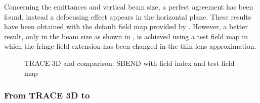 \begin{itemize}
Concerning the emittances and vertical beam size, a perfect agreement has been found, instead a defocusing effect appears in the horizontal plane. These results have been obtained with the default field map provided by \opal. However, a better result, only in the beam size as shown in , is achieved using a test field map in which the fringe field extension has been changed in the thin lens approximation.

\begin{figure}[htbp]
\begin{center}
    \hspace{1.8cm}
    \caption{TRACE 3D and \opal comparison: SBEND with field index and test field map}
    \label{fig:SBEND_FI_test}
 \end{center}
 \end{figure}
\end{itemize}

\subsubsection{From TRACE 3D to \opalt}
\label{ssec:T3DtoOPAL}

